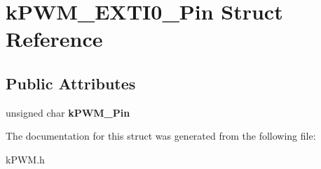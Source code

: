 \hypertarget{structkPWM__EXTI0__Pin}{}\section{k\+P\+W\+M\+\_\+\+E\+X\+T\+I0\+\_\+\+Pin Struct Reference}
\label{structkPWM__EXTI0__Pin}
\subsection*{Public Attributes}
\begin{DoxyCompactItemize}
\item 
unsigned char {\bfseries k\+P\+W\+M\+\_\+\+Pin}\hypertarget{structkPWM__EXTI0__Pin_a3ed1084a8325763f6a13bec108e4931f}{}\label{structkPWM__EXTI0__Pin_a3ed1084a8325763f6a13bec108e4931f}

\end{DoxyCompactItemize}


The documentation for this struct was generated from the following file\+:\begin{DoxyCompactItemize}
\item 
k\+P\+W\+M.\+h\end{DoxyCompactItemize}
